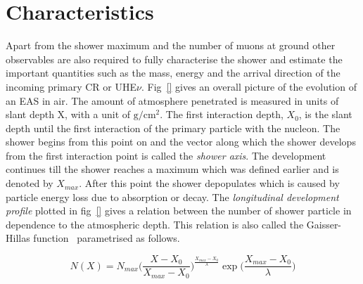 \section{Characteristics}
\label{sec:EAS_cha}
Apart from the shower maximum and the number of muons at ground other observables are also required to fully characterise the shower and estimate the important quantities such as the mass, energy and the arrival direction of the incoming primary CR or UHE$\nu$. Fig~\ref{} gives an overall picture of the evolution of an EAS in air. The amount of atmosphere penetrated is measured in units of slant depth X, with a unit of $\mathrm{g/cm^2}$. The first interaction depth, $X_0$, is the slant depth until the first interaction of the primary particle with the nucleon. The shower begins from this point on and the vector along which the shower develops from the first interaction point is called the \textit{shower axis}. The development continues till the shower reaches a maximum which was defined earlier and is denoted by $X_{max}$. After this point the shower depopulates which is caused by particle energy loss due to absorption or decay. The \textit{longitudinal development profile} plotted in fig~\ref{} gives a relation between the number of shower particle in dependence to the atmospheric depth. This relation is also called the Gaisser-Hillas function~\cite{1977ICRC....8..353G} parametrised as follows.

\begin{equation}
    N(X) =  N_{max} \biggl(\frac{X- X_0}{X_{max} -  X_0}\biggr)^{\frac{X_{max}-X_0}{\lambda}} \exp \biggl(\frac{X_{max}-X_0}{\lambda}\biggr)
\end{equation}


